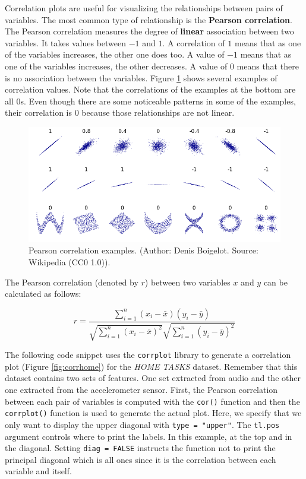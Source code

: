 \documentclass[
  11pt,
]{krantz}
\begin{document}
Correlation plots are useful for visualizing the relationships between pairs of variables. The most common type of relationship is the \textbf{Pearson correlation}. The Pearson correlation measures the degree of \textbf{linear} association between two variables. It takes values between \(-1\) and \(1\). A correlation of \(1\) means that as one of the variables increases, the other one does too. A value of \(-1\) means that as one of the variables increases, the other decreases. A value of \(0\) means that there is no association between the variables. Figure \ref{fig:pearsonExamples} shows several examples of correlation values. Note that the correlations of the examples at the bottom are all \(0\)s. Even though there are some noticeable patterns in some of the examples, their correlation is \(0\) because those relationships are not linear.



\begin{figure}

{\centering \includegraphics[width=0.9\linewidth]{images/pearsonCorrelatoin} 

}

\caption{Pearson correlation examples. (Author: Denis Boigelot. Source: Wikipedia (CC0 1.0)).}\label{fig:pearsonExamples}
\end{figure}

The Pearson correlation (denoted by \(r\)) between two variables \(x\) and \(y\) can be calculated as follows:

\begin{equation}
  r = \frac{ \sum_{i=1}^{n}(x_i-\bar{x})(y_i-\bar{y}) }{ \sqrt{\sum_{i=1}^{n}(x_i-\bar{x})^2}\sqrt{\sum_{i=1}^{n}(y_i-\bar{y})^2}}
  \label{eq:pearsoncorr}
\end{equation}

The following code snippet uses the \texttt{corrplot} library to generate a correlation plot (Figure \ref{fig:corrhome}) for the \emph{HOME TASKS} dataset. Remember that this dataset contains two sets of features. One set extracted from audio and the other one extracted from the accelerometer sensor. First, the Pearson correlation between each pair of variables is computed with the \texttt{cor()} function and then the \texttt{corrplot()} function is used to generate the actual plot. Here, we specify that we only want to display the upper diagonal with \texttt{type\ =\ "upper"}. The \texttt{tl.pos} argument controls where to print the labels. In this example, at the top and in the diagonal. Setting \texttt{diag\ =\ FALSE} instructs the function not to print the principal diagonal which is all ones since it is the correlation between each variable and itself.
\end{document}
